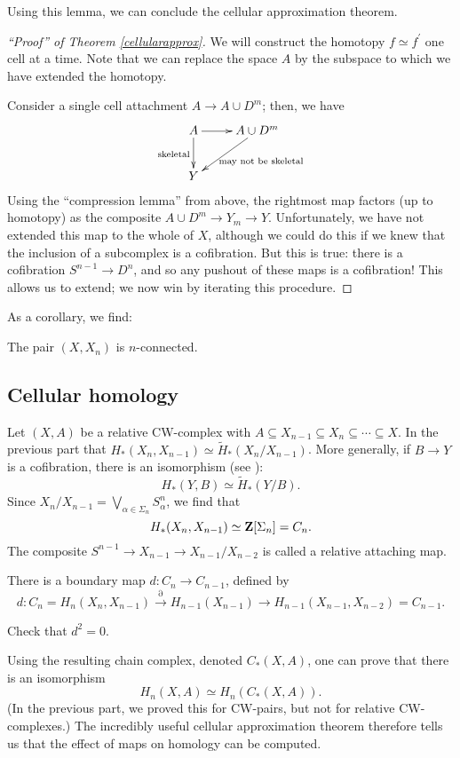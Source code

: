 Using this lemma, we can conclude the cellular approximation theorem.
\begin{proof}[``Proof'' of Theorem \ref{cellularapprox}]
    We will construct the homotopy $f\simeq f^\prime$ one cell at a time.
    Note that we can replace the space $A$ by the subspace to which we have extended the homotopy.
    
    Consider a single cell attachment $A\to A\cup D^m$; then, we have
    \begin{equation*}
	\xymatrix{
	A\ar[d]_{\text{skeletal}}\ar[r] & A\cup D^m\ar[dl]^{\text{ may not be skeletal}}\\
	Y &
	}
    \end{equation*}
    Using the ``compression lemma'' from above, the rightmost map factors (up to homotopy) as the composite
    $A\cup D^m\to Y_m \to Y$.
    Unfortunately, we have not extended this map to the whole of $X$, although we could do this
    if we knew that the inclusion of a subcomplex is a cofibration.
    But this is true: there is a cofibration $S^{n-1}\to D^n$, and so any pushout of these maps is a cofibration!
    This allows us to extend; we now win by iterating this procedure.
\end{proof}
As a corollary, we find:
\begin{exercise}
    The pair $(X,X_n)$ is $n$-connected.
\end{exercise}
\subsection{Cellular homology}
Let $(X,A)$ be a relative CW-complex with $A\subseteq X_{n-1}\subseteq X_n\subseteq\cdots\subseteq X$.
In the previous part  that $H_\ast(X_n,X_{n-1})\simeq \widetilde{H}_\ast(X_n/X_{n-1})$.
More generally, if $B\to Y$ is a cofibration, there is an isomorphism (see \cite[p. 433]{bredon}):
$$H_\ast(Y,B)\simeq\widetilde{H}_\ast(Y/B).$$
Since $X_n/X_{n-1} = \bigvee_{\alpha\in \Sigma_n}S^n_\alpha$, we find that
$$H_\ast(X_n,X_{n-1})\simeq \mathbf Z[\Sigma_n] = C_n.$$
The composite $S^{n-1}\to X_{n-1}\to X_{n-1}/X_{n-2}$ is called a relative attaching map.

There is a boundary map $d:C_n\to C_{n-1}$, defined by
$$d:C_n = H_n(X_n,X_{n-1})\xrightarrow{\partial}H_{n-1}(X_{n-1})\to H_{n-1}(X_{n-1},X_{n-2}) = C_{n-1}.$$
\begin{exercise}
    Check that $d^2 = 0$.
\end{exercise}
Using the resulting chain complex, denoted $C_\ast(X,A)$, one can prove that there is an isomorphism
$$H_n(X,A)\simeq H_n(C_\ast(X,A)).$$
(In the previous part, we proved this for CW-pairs, but not for relative CW-complexes.)
The incredibly useful cellular approximation theorem therefore tells us that the effect of maps on homology can be computed.

